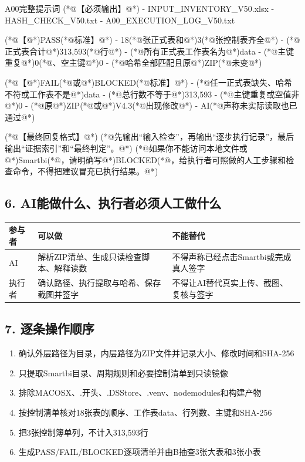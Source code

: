 \documentclass[UTF8,openany,zihao=-4]{ctexbook}
\renewcommand{\_}{\textunderscore\allowbreak}
\begin{document}
\begin{PromptBox}{A00完整提示词}
(*@{\promptcjk 【必须输出】}@*)
- INPUT_INVENTORY_V50.xlsx
- HASH_CHECK_V50.txt
- A00_EXECUTION_LOG_V50.txt

(*@{\promptcjk 【}@*)PASS(*@{\promptcjk 标准】}@*)
- 18(*@{\promptcjk 张正式表和}@*)3(*@{\promptcjk 张控制表齐全}@*)
- (*@{\promptcjk 正式表合计}@*)313,593(*@{\promptcjk 行}@*)
- (*@{\promptcjk 所有正式表工作表名为}@*)data
- (*@{\promptcjk 主键重复}@*)0(*@{\promptcjk 、空主键}@*)0
- (*@{\promptcjk 哈希全部匹配且原}@*)ZIP(*@{\promptcjk 未变}@*)

(*@{\promptcjk 【}@*)FAIL(*@{\promptcjk 或}@*)BLOCKED(*@{\promptcjk 标准】}@*)
- (*@{\promptcjk 任一正式表缺失、哈希不符或工作表不是}@*)data
- (*@{\promptcjk 总行数不等于}@*)313,593
- (*@{\promptcjk 主键重复或空值非}@*)0
- (*@{\promptcjk 原}@*)ZIP(*@{\promptcjk 或}@*)V4.3(*@{\promptcjk 出现修改}@*)
- AI(*@{\promptcjk 声称未实际读取也已通过}@*)

(*@{\promptcjk 【最终回复格式】}@*)
(*@{\promptcjk 先输出“输入检查”，再输出“逐步执行记录”，最后输出“证据索引”和“最终判定”。}@*)
(*@{\promptcjk 如果你不能访问本地文件或}@*)Smartbi(*@{\promptcjk ，请明确写}@*)BLOCKED(*@{\promptcjk ，给执行者可照做的人工步骤和检查命令，不得把建议冒充已执行结果。}@*)
\end{PromptBox}

\subsection*{6. AI能做什么、执行者必须人工做什么}
\noindent\begin{tabularx}{\textwidth}{@{}p{}XX@{}}
\toprule
\textbf{参与者} & \textbf{可以做} & \textbf{不能替代} \\
\midrule
AI & 解析ZIP清单、生成只读检查脚本、解释读数 & 不得声称已经点击Smartbi或完成真人签字 \\
执行者 & 确认路径、执行提取与哈希、保存截图并签字 & 不得让AI替代真实上传、截图、复核与签字 \\
\bottomrule
\end{tabularx}

\subsection*{7. 逐条操作顺序}
\begin{enumerate}
\item 确认外层路径为目录，内层路径为ZIP文件并记录大小、修改时间和SHA-256
\item 只提取Smartbi目录、周期规则和必要控制清单到只读镜像
\item 排除\_\_MACOSX、.\_开头、.DS\_Store、.venv、node\_modules和构建产物
\item 按控制清单核对18张表的顺序、工作表data、行列数、主键和SHA-256
\item 把3张控制簿单列，不计入313,593行
\item 生成PASS/FAIL/BLOCKED逐项清单并由B抽查3张大表和3张小表
\end{enumerate}
\end{document}

